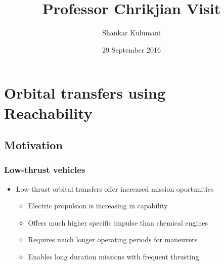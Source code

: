 \documentclass[11pt,professionalfonts]{beamer}
\title[Research Summary]{\large\bf  Professor Chrikjian Visit}
\author{Shankar Kulumani}
\date{29 September 2016}
\institute{
\large{\textbf{Flight Dynamics \& Control Lab}}\\
  \begin{figure} %
        \texttt{[image: gw\_txh\_2cs\_pos]}
    \end{figure}
}
\begin{document}

\setcounter{framenumber}{-1}
\begin{frame} %
  \titlepage
\end{frame}   %

\section{Orbital transfers using Reachability}
\subsection{Motivation}

\begin{frame} %
\frametitle{Low-thrust vehicles} %
\begin{itemize}
    \item Low-thrust orbital transfers offer increased mission oportunities
    \begin{itemize}
        \item Electric propulsion is increasing in capability
        \item Offers much higher specific impulse than chemical engines 
        \item Requires much longer operating periods for maneuvers 
        \item Enables long duration missions with frequent thrusting
    \end{itemize}
\end{itemize}


\end{frame}
\end{document}
